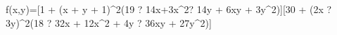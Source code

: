 f(x,y)=[1 + (x + y + 1)^2(19 ? 14x+3x^2? 14y + 6xy + 3y^2)][30 + (2x ? 3y)^2(18 ? 32x + 12x^2 + 4y ? 36xy + 27y^2)]